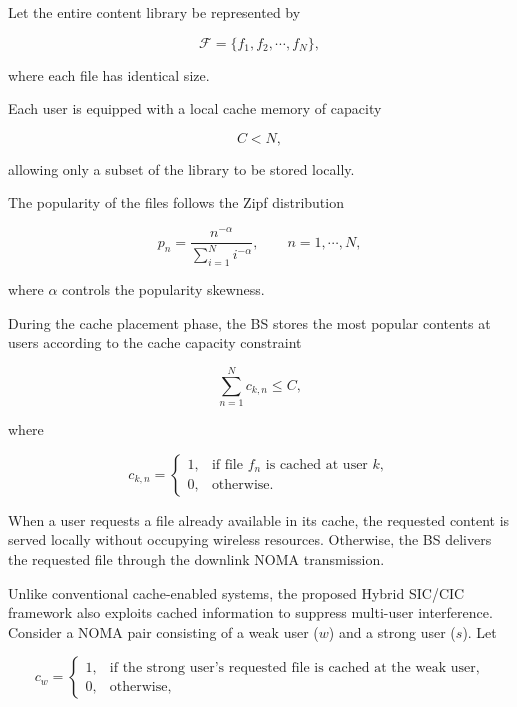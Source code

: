 \documentclass[12pt,a4paper]{article}
\begin{document}
Let the entire content library be represented by

\begin{equation}
\mathcal{F}
=
\{f_1,f_2,\cdots,f_N\},
\end{equation}

where each file has identical size.

Each user is equipped with a local cache memory of capacity

\begin{equation}
C<N,
\end{equation}

allowing only a subset of the library to be stored locally.

The popularity of the files follows the Zipf distribution

\begin{equation}
p_n=
\frac{n^{-\alpha}}
{\sum_{i=1}^{N}i^{-\alpha}},
\qquad
n=1,\cdots,N,
\label{eq:zipf_distribution}
\end{equation}

where $\alpha$ controls the popularity skewness.

During the cache placement phase, the BS stores the most popular contents at users according to the cache capacity constraint

\begin{equation}
\sum_{n=1}^{N}c_{k,n}\le C,
\label{eq:cache_constraint}
\end{equation}

where

\begin{equation}
c_{k,n}
=
\begin{cases}
1, & \text{if file }f_n\text{ is cached at user }k,\\
0, & \text{otherwise}.
\end{cases}
\label{eq:cache_indicator}
\end{equation}

When a user requests a file already available in its cache, the requested content is served locally without occupying wireless resources. Otherwise, the BS delivers the requested file through the downlink NOMA transmission.

Unlike conventional cache-enabled systems, the proposed Hybrid SIC/CIC framework also exploits cached information to suppress multi-user interference. Consider a NOMA pair consisting of a weak user ($w$) and a strong user ($s$). Let

\begin{equation}
c_w=
\begin{cases}
1,& \text{if the strong user's requested file is cached at the weak user},\\
0,& \text{otherwise},
\end{cases}
\end{equation}
\end{document}
